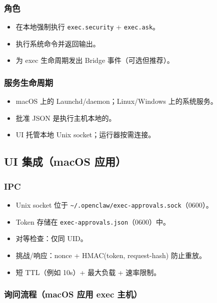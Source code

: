 \subsubsection{角色}


\begin{itemize}
  \item 在本地强制执行 \texttt{exec.security} + \texttt{exec.ask}。
  \item 执行系统命令并返回输出。
  \item 为 exec 生命周期发出 Bridge 事件（可选但推荐）。
\end{itemize}


\subsubsection{服务生命周期}


\begin{itemize}
  \item macOS 上的 Launchd/daemon；Linux/Windows 上的系统服务。
  \item 批准 JSON 是执行主机本地的。
  \item UI 托管本地 Unix socket；运行器按需连接。
\end{itemize}


\subsection{UI 集成（macOS 应用）}


\subsubsection{IPC}


\begin{itemize}
  \item Unix socket 位于 \texttt{\textasciitilde{}/.openclaw/exec-approvals.sock}（0600）。
  \item Token 存储在 \texttt{exec-approvals.json}（0600）中。
  \item 对等检查：仅同 UID。
  \item 挑战/响应：nonce + HMAC(token, request-hash) 防止重放。
  \item 短 TTL（例如 10s）+ 最大负载 + 速率限制。
\end{itemize}


\subsubsection{询问流程（macOS 应用 exec 主机）}


